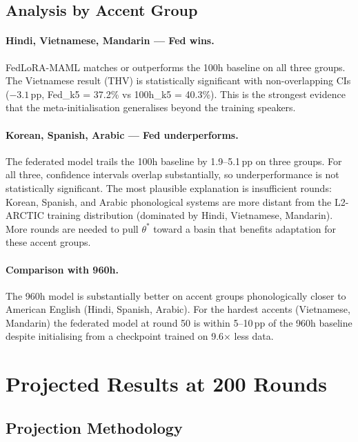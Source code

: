 \documentclass[12pt]{article}
\theoremstyle{plain}
\begin{document}
\subsection{Analysis by Accent Group}

\paragraph{Hindi, Vietnamese, Mandarin --- Fed wins.}
FedLoRA-MAML matches or outperforms the 100h baseline on all three groups.
The Vietnamese result (THV) is statistically significant with non-overlapping
CIs ($-3.1$\,pp, Fed\_k5 = 37.2\% vs 100h\_k5 = 40.3\%).
This is the strongest evidence that the meta-initialisation generalises beyond
the training speakers.

\paragraph{Korean, Spanish, Arabic --- Fed underperforms.}
The federated model trails the 100h baseline by 1.9--5.1\,pp on three groups.
For all three, confidence intervals overlap substantially,
so underperformance is not statistically significant.
The most plausible explanation is insufficient rounds:
Korean, Spanish, and Arabic phonological systems are more distant from the
L2-ARCTIC training distribution (dominated by Hindi, Vietnamese, Mandarin).
More rounds are needed to pull $\theta^*$ toward a basin that benefits
adaptation for these accent groups.

\paragraph{Comparison with 960h.}
The 960h model is substantially better on accent groups phonologically closer
to American English (Hindi, Spanish, Arabic).
For the hardest accents (Vietnamese, Mandarin) the federated model at round 50
is within 5--10\,pp of the 960h baseline despite initialising from a checkpoint
trained on 9.6$\times$ less data.

\section{Projected Results at 200 Rounds}
\label{sec:projection}

\subsection{Projection Methodology}
\end{document}

